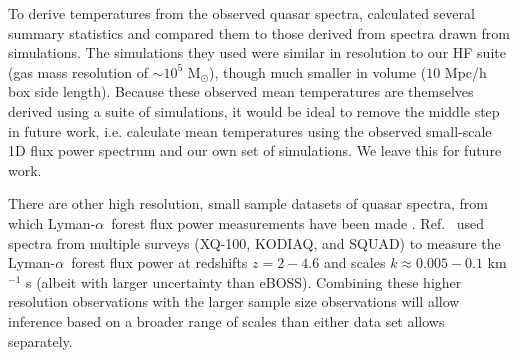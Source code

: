 \documentclass[a4paper,11pt]{article}
\newcommand{\lya}{Lyman-$\alpha$\ }
\begin{document}
To derive temperatures from the observed quasar spectra, \cite{2021MNRAS.506.4389G} calculated several summary statistics and compared them to those derived from spectra drawn from simulations.
The simulations they used were similar in resolution to our HF suite (gas mass resolution of $\sim10^5$ M$_{\odot}$), though much smaller in volume ($10$ Mpc/h box side length). Because these observed mean temperatures are themselves derived using a suite of simulations, it would be ideal to remove the middle step in future work, i.e. calculate mean temperatures using the observed small-scale 1D flux power spectrum and our own set of simulations. We leave this for future work.

There are other high resolution, small sample datasets of quasar spectra, from which \lya forest flux power measurements have been made \cite{2017MNRAS.466.4332I, 2022MNRAS.509.2842K, 2019MNRAS.489.2536D}. Ref.~\cite{2022MNRAS.509.2842K} used spectra from multiple surveys (XQ-100, KODIAQ, and SQUAD) to measure the \lya forest flux power at redshifts $z=2-4.6$ and scales $k\approx0.005-0.1$ km$^{-1}$ s (albeit with larger uncertainty than eBOSS).
Combining these higher resolution observations with the larger sample size observations will allow inference based on a broader range of scales than either data set allows separately.


\end{document}
